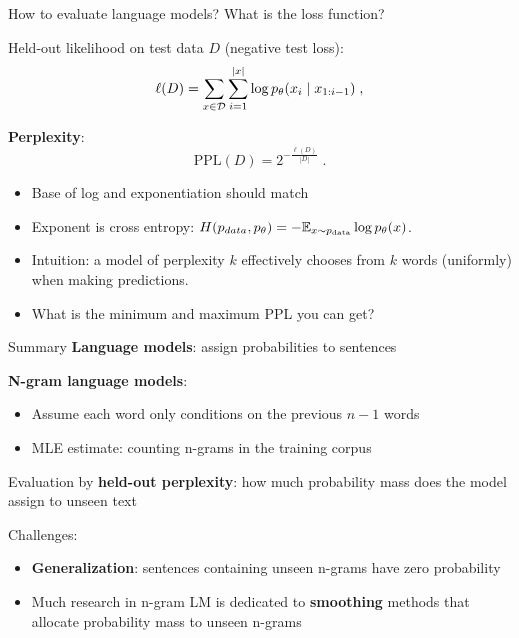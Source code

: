\documentclass[usenames,dvipsnames,notes,11pt,aspectratio=169,hyperref={colorlinks=true, linkcolor=blue}]{beamer}
\newcommand{\pdfnote}[1]{}
\begin{document}
\begin{frame}
    {How to evaluate language models?}
    \pause
    What is the loss function?
    \pause

    Held-out likelihood on test data $D$ (negative test loss):
    $$
    \ell({D}) = \sum_{x\in\mathcal{D}}\sum_{i=1}^{|x|} \log p_\theta(x_i\mid x_{1:i-1}) \;,
    $$
    \vspace{-2em}
    \pdfnote{In practice, no sentence segmentation, a sequence of words, average likelihood of each word}
    \pause

    \textbf{Perplexity}:
    $$
 \text{PPL}(D) = 2^{-\frac{\ell(D)}{|D|}} \;.
 $$
    \vspace{-2em}
    \begin{itemize}[<+->]
        \item Base of log and exponentiation should match
        \item Exponent is cross entropy: $H(p_{data}, p_\theta) = -\mathbb{E}_{x\sim p_{\text{data}}}\log p_\theta(x)$.
            \pdfnote{Entropy is the number of bits needed to encode an event from a certain distribution.}
            \pdfnote{Cross-entropy is the number of bits needed to encode an event from a certain distribution (here p data) when your coding scheme is optimized for another distribution (here p theta).}
        \item Intuition: a model of perplexity $k$ effectively chooses from $k$ words (uniformly) when making predictions. 
        \item What is the minimum and maximum PPL you can get?
            \pdfnote{2 to the number of bits: total number of outcomes}
            \pdfnote{Sanity check: if PPL is larger than vocab size, something must be wrong.}
    \end{itemize}
\end{frame}

\begin{frame}
    {Summary}
    \textbf{Language models}: assign probabilities to sentences
    \pause

    \textbf{N-gram language models}:\\
    \begin{itemize}
        \item Assume each word only conditions on the previous $n-1$ words
        \item MLE estimate: counting n-grams in the training corpus
    \end{itemize}
    \pause

    {Evaluation} by \textbf{held-out perplexity}: how much probability mass does the model assign to unseen text 
    \pause

    Challenges:\\
    \begin{itemize}
        \item \textbf{Generalization}: sentences containing unseen n-grams have zero probability
        \item Much research in n-gram LM is dedicated to \textbf{smoothing} methods that allocate probability mass to unseen n-grams
    \end{itemize}
\end{frame}
\end{document}
